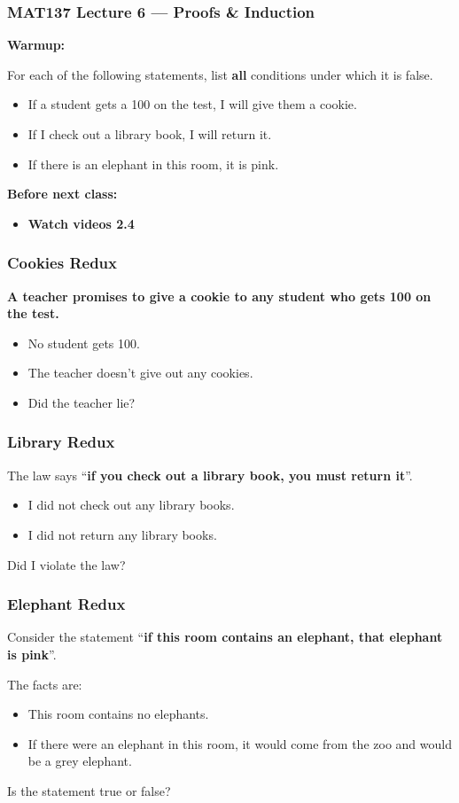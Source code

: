 \documentclass[14pt]{beamer}
\begin{document}
\begin{frame}
	\frametitle{MAT137 Lecture 6 --- Proofs \& Induction}

	{\bf Warmup:}

	For each of the following statements, list {\bf all} conditions under which it is false.
	\begin{itemize}
		\item If a student gets a 100 on the test, I will give them a cookie.
		\item If I check out a library book, I will return it.
		\item If there is an elephant in this room, it is pink.
	\end{itemize}
	\vfill
	{\bf Before next class:}
		\begin{itemize} \normalsize
			\item {\bf Watch videos 2.4 }
		\end{itemize}
	\vfill

\end{frame}

\begin{frame}
\frametitle{Cookies Redux}
	\textbf{A teacher promises to give a cookie to any student who gets 100 on the test.}
	\begin{itemize}
		\bigskip
		\item No student gets 100.
		\item The teacher doesn't give out any cookies.
		\vfill
		\item Did the teacher lie?
	\end{itemize}

\vfill

\end{frame}

\begin{frame}
\frametitle{Library Redux}
	The law says ``{\bf if you check out a library book, you must return it}''.
	\begin{itemize}
		\item I did not check out any library books.
		\item I did not return any library books.
	\end{itemize}
	Did I violate the law?
\vfill
\end{frame}

\begin{frame}
\frametitle{Elephant Redux}
	Consider the statement ``{\bf if this room contains an elephant, that elephant is pink}''.

	The facts are:
	\begin{itemize}
		\item This room contains no elephants.
		\item If there were an elephant in this room, it would come from the zoo and would be a grey elephant.
	\end{itemize}
	Is the statement true or false?
\vfill
\end{frame}
\end{document}
